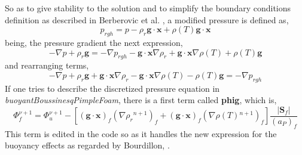 \noindent So as to give stability to the solution and to simplify the boundary conditions definition as described in Berberovic et al. \cite{berberovic_van_hinsberg_jakirlic_roisman_tropea_2009}, a modified pressure is defined as,
\begin{equation}
	p_{r g h}=p-\rho_{r} \textbf{g} \cdot \textbf{x} + \rho(T) \textbf{g} \cdot \textbf{x}
	\label{3.18}
\end{equation}
being, the pressure gradient the next expression,
\begin{equation}
	-\nabla p+\rho_{r} \textbf{g}=-\nabla p_{r g h}-\textbf{g} \cdot \textbf{x} \nabla \rho_{r} + \textbf{g} \cdot \textbf{x} \nabla \rho(T) + \rho(T) \textbf{g}
	\label{3.19}
\end{equation}
and rearranging terms, 
\begin{equation}
	-\nabla p+\rho_{r} \textbf{g} + \textbf{g} \cdot \textbf{x} \nabla \rho_{r} - \textbf{g} \cdot \textbf{x} \nabla \rho(T) - \rho(T) \textbf{g}=-\nabla p_{r g h}
	\label{3.20}
\end{equation}
If one tries to describe the discretized pressure equation in \textit{buoyantBoussinesqPimpleFoam}, there is a first term called \textbf{phig}, which is,
\begin{equation}
	\Phi_{f}^{\nu+1}=\Phi_{u}^{\nu+1} - \left[(\textbf{g} \cdot \textbf{x})_{f}\left(\nabla \rho_{r}{ }^{n+1}\right)_{f}+(\textbf{g} \cdot \textbf{x})_{f}\left(\nabla \rho(T){ }^{n+1}\right)_{f}\right]\frac{\left|\textbf{S}_{f}\right|}{\left(a_{P}\right)_{f}}
	\label{3.21}
\end{equation}
This term is edited in the code so as it handles the new expression for the buoyancy effects as regarded by Bourdillon, \cite{bourdillon_2016}.

